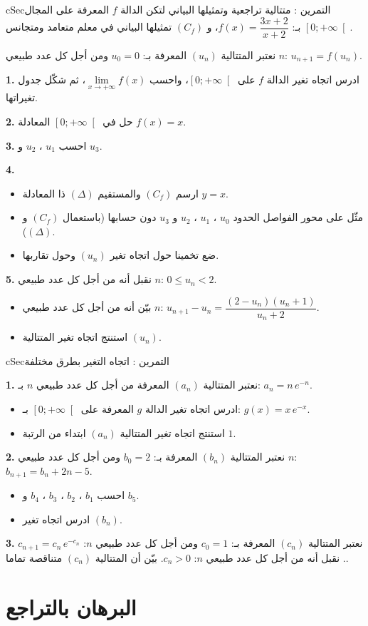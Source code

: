 \documentclass[12pt,a4paper]{article}
\newenvironment{BOX}[2]{\begin{otherlanguage}{english}\begin{arbox}{#1}{#2}}{\end{arbox}\end{otherlanguage}}
\newcounter{exo}
\newenvironment{tamrin}[1]{\stepcounter{exo}\begin{BOX}{cSec}{التمرين \theexo: #1}}{\end{BOX}}
\newenvironment{sq}{\begin{itemize}[leftmargin=2.4em,itemsep=3pt]}{\end{itemize}}
\newcommand{\qa}{\item[(أ)]}\newcommand{\qb}{\item[(ب)]}\newcommand{\qc}{\item[(جـ)]}\newcommand{\qd}{\item[(د)]}\newcommand{\qe}{\item[(هـ)]}
\newcommand{\QQ}[1]{\par\smallskip\textbf{#1.} }
\begin{document}
\begin{tamrin}{متتالية تراجعية وتمثيلها البياني}
لتكن الدالة $f$ المعرفة على المجال $\left[0;+\infty\right[$ بـ: $f(x)=\dfrac{3x+2}{x+2}$، و $(C_f)$ تمثيلها البياني في معلم متعامد ومتجانس.

نعتبر المتتالية $(u_n)$ المعرفة بـ: $u_0=0$ ومن أجل كل عدد طبيعي $n$: $u_{n+1}=f(u_n)$.
\QQ{1} ادرس اتجاه تغير الدالة $f$ على $\left[0;+\infty\right[$، واحسب $\lim\limits_{x\to+\infty}f(x)$، ثم شكّل جدول تغيراتها.
\QQ{2} حل في $\left[0;+\infty\right[$ المعادلة $f(x)=x$.
\QQ{3} احسب $u_1$ ، $u_2$ و $u_3$.
\QQ{4}
\begin{sq}
\qa ارسم $(C_f)$ والمستقيم $(\Delta)$ ذا المعادلة $y=x$.
\qb مثّل على محور الفواصل الحدود $u_0$ ، $u_1$ ، $u_2$ و $u_3$ دون حسابها (باستعمال $(C_f)$ و $(\Delta)$).
\qc ضع تخمينا حول اتجاه تغير $(u_n)$ وحول تقاربها.
\end{sq}
\QQ{5} نقبل أنه من أجل كل عدد طبيعي $n$: $0\leqslant u_n<2$.
\begin{sq}
\qa بيّن أنه من أجل كل عدد طبيعي $n$: $u_{n+1}-u_n=\dfrac{(2-u_n)(u_n+1)}{u_n+2}$.
\qb استنتج اتجاه تغير المتتالية $(u_n)$.
\end{sq}
\end{tamrin}

\begin{tamrin}{اتجاه التغير بطرق مختلفة}
\QQ{1} نعتبر المتتالية $(a_n)$ المعرفة من أجل كل عدد طبيعي $n$ بـ: $a_n=n\,e^{-n}$.
\begin{sq}
\qa ادرس اتجاه تغير الدالة $g$ المعرفة على $\left[0;+\infty\right[$ بـ: $g(x)=x\,e^{-x}$.
\qb استنتج اتجاه تغير المتتالية $(a_n)$ ابتداء من الرتبة $1$.
\end{sq}
\QQ{2} نعتبر المتتالية $(b_n)$ المعرفة بـ: $b_0=2$ ومن أجل كل عدد طبيعي $n$: $b_{n+1}=b_n+2n-5$.
\begin{sq}
\qa احسب $b_1$ ، $b_2$ ، $b_3$ ، $b_4$ و $b_5$.
\qb ادرس اتجاه تغير $(b_n)$.
\end{sq}
\QQ{3} نعتبر المتتالية $(c_n)$ المعرفة بـ: $c_0=1$ ومن أجل كل عدد طبيعي $n$: $c_{n+1}=c_n\,e^{-c_n}$.
نقبل أنه من أجل كل عدد طبيعي $n$: $c_n>0$. بيّن أن المتتالية $(c_n)$ متناقصة تماما.
\end{tamrin}

\section{البرهان بالتراجع}
\end{document}
